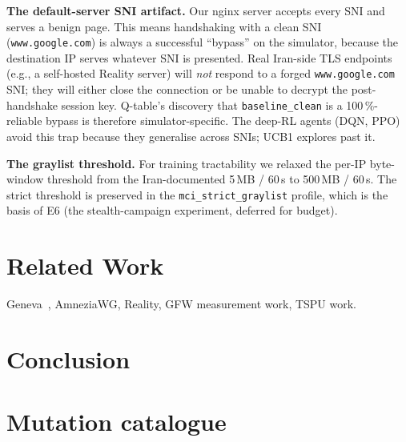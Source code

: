 \documentclass[letterpaper,twocolumn,10pt]{article}
\begin{document}
\textbf{The default-server SNI artifact.} Our nginx server accepts every
SNI and serves a benign page. This means handshaking with a clean SNI
(\texttt{www.google.com}) is always a successful ``bypass'' on the
simulator, because the destination IP serves whatever SNI is presented.
Real Iran-side TLS endpoints (e.g., a self-hosted Reality server) will
\emph{not} respond to a forged \texttt{www.google.com} SNI; they will
either close the connection or be unable to decrypt the post-handshake
session key. Q-table's discovery that \texttt{baseline\_clean} is a
100\,\%-reliable bypass is therefore simulator-specific. The deep-RL
agents (DQN, PPO) avoid this trap because they generalise across SNIs;
UCB1 explores past it.

\textbf{The graylist threshold.} For training tractability we relaxed
the per-IP byte-window threshold from the Iran-documented 5\,MB / 60\,s
to 500\,MB / 60\,s. The strict threshold is preserved in the
\texttt{mci\_strict\_graylist} profile, which is the basis of E6 (the
stealth-campaign experiment, deferred for budget).

\section{Related Work}
Geneva~\cite{bock2019geneva}, AmneziaWG, Reality, GFW measurement work,
TSPU work.

\section{Conclusion}




\appendix
\section{Mutation catalogue}
\label{app:catalog}
\end{document}
